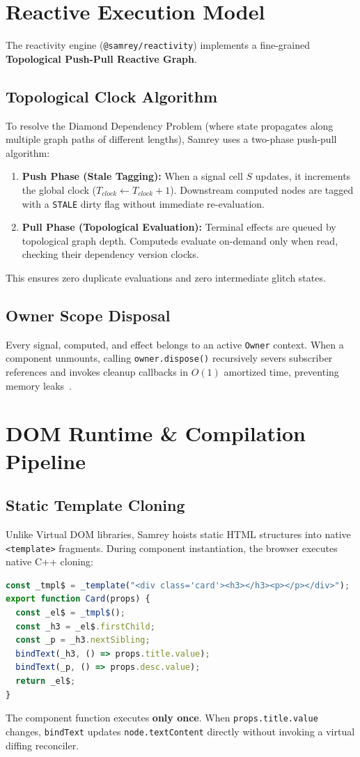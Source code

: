 \documentclass[10pt,journal,compsoc]{IEEEtran}
\begin{document}
\section{Reactive Execution Model}
The reactivity engine (\texttt{@samrey/reactivity}) implements a fine-grained \textbf{Topological Push-Pull Reactive Graph}.

\subsection{Topological Clock Algorithm}
To resolve the Diamond Dependency Problem (where state propagates along multiple graph paths of different lengths), Samrey uses a two-phase push-pull algorithm:
\begin{enumerate}
    \item \textbf{Push Phase (Stale Tagging):} When a signal cell $S$ updates, it increments the global clock ($T_{clock} \leftarrow T_{clock} + 1$). Downstream computed nodes are tagged with a \texttt{STALE} dirty flag without immediate re-evaluation.
    \item \textbf{Pull Phase (Topological Evaluation):} Terminal effects are queued by topological graph depth. Computeds evaluate on-demand only when read, checking their dependency version clocks.
\end{enumerate}
This ensures zero duplicate evaluations and zero intermediate glitch states.

\subsection{Owner Scope Disposal}
Every signal, computed, and effect belongs to an active \texttt{Owner} context. When a component unmounts, calling \texttt{owner.dispose()} recursively severs subscriber references and invokes cleanup callbacks in $O(1)$ amortized time, preventing memory leaks~\cite{he2013understanding}.

\section{DOM Runtime \& Compilation Pipeline}
\subsection{Static Template Cloning}
Unlike Virtual DOM libraries, Samrey hoists static HTML structures into native \texttt{<template>} fragments. During component instantiation, the browser executes native C++ cloning:
\begin{lstlisting}[language=JavaScript]
const _tmpl$ = _template("<div class='card'><h3></h3><p></p></div>");
export function Card(props) {
  const _el$ = _tmpl$();
  const _h3 = _el$.firstChild;
  const _p = _h3.nextSibling;
  bindText(_h3, () => props.title.value);
  bindText(_p, () => props.desc.value);
  return _el$;
}
\end{lstlisting}
The component function executes \textbf{only once}. When \texttt{props.title.value} changes, \texttt{bindText} updates \texttt{node.textContent} directly without invoking a virtual diffing reconciler.
\end{document}
